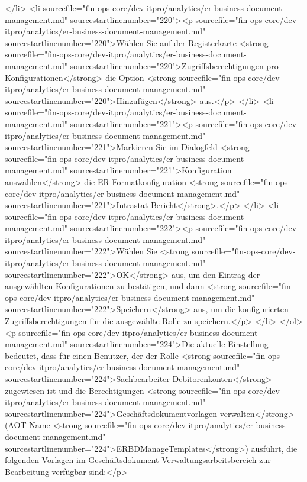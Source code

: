 </li>
<li sourcefile="fin-ops-core/dev-itpro/analytics/er-business-document-management.md" sourcestartlinenumber="220"><p sourcefile="fin-ops-core/dev-itpro/analytics/er-business-document-management.md" sourcestartlinenumber="220">Wählen Sie auf der Registerkarte <strong sourcefile="fin-ops-core/dev-itpro/analytics/er-business-document-management.md" sourcestartlinenumber="220">Zugriffsberechtigungen pro Konfigurationen</strong> die Option <strong sourcefile="fin-ops-core/dev-itpro/analytics/er-business-document-management.md" sourcestartlinenumber="220">Hinzufügen</strong> aus.</p>
</li>
<li sourcefile="fin-ops-core/dev-itpro/analytics/er-business-document-management.md" sourcestartlinenumber="221"><p sourcefile="fin-ops-core/dev-itpro/analytics/er-business-document-management.md" sourcestartlinenumber="221">Markieren Sie im Dialogfeld <strong sourcefile="fin-ops-core/dev-itpro/analytics/er-business-document-management.md" sourcestartlinenumber="221">Konfiguration auswählen</strong> die ER-Formatkonfiguration <strong sourcefile="fin-ops-core/dev-itpro/analytics/er-business-document-management.md" sourcestartlinenumber="221">Intrastat-Bericht</strong>.</p>
</li>
<li sourcefile="fin-ops-core/dev-itpro/analytics/er-business-document-management.md" sourcestartlinenumber="222"><p sourcefile="fin-ops-core/dev-itpro/analytics/er-business-document-management.md" sourcestartlinenumber="222">Wählen Sie <strong sourcefile="fin-ops-core/dev-itpro/analytics/er-business-document-management.md" sourcestartlinenumber="222">OK</strong> aus, um den Eintrag der ausgewählten Konfigurationen zu bestätigen, und dann <strong sourcefile="fin-ops-core/dev-itpro/analytics/er-business-document-management.md" sourcestartlinenumber="222">Speichern</strong> aus, um die konfigurierten Zugriffsberechtigungen für die ausgewählte Rolle zu speichern.</p>
</li>
</ol>
<p sourcefile="fin-ops-core/dev-itpro/analytics/er-business-document-management.md" sourcestartlinenumber="224">Die aktuelle Einstellung bedeutet, dass für einen Benutzer, der der Rolle <strong sourcefile="fin-ops-core/dev-itpro/analytics/er-business-document-management.md" sourcestartlinenumber="224">Sachbearbeiter Debitorenkonten</strong> zugewiesen ist und die Berechtigungen <strong sourcefile="fin-ops-core/dev-itpro/analytics/er-business-document-management.md" sourcestartlinenumber="224">Geschäftsdokumentvorlagen verwalten</strong> (AOT-Name <strong sourcefile="fin-ops-core/dev-itpro/analytics/er-business-document-management.md" sourcestartlinenumber="224">ERBDManageTemplates</strong>) ausführt, die folgenden Vorlagen im Geschäftsdokument-Verwaltungsarbeitsbereich zur Bearbeitung verfügbar sind:</p>
